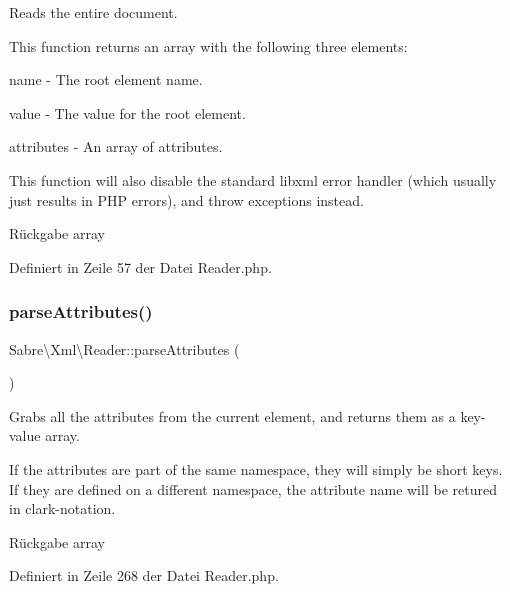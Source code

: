 Reads the entire document.

This function returns an array with the following three elements\+:
\begin{DoxyItemize}
\item name -\/ The root element name.
\item value -\/ The value for the root element.
\item attributes -\/ An array of attributes.
\end{DoxyItemize}

This function will also disable the standard libxml error handler (which usually just results in P\+HP errors), and throw exceptions instead.

\begin{DoxyReturn}{Rückgabe}
array 
\end{DoxyReturn}


Definiert in Zeile 57 der Datei Reader.\+php.

\mbox{\label{class_sabre_1_1_xml_1_1_reader_a174dc5b37a08e3842ccfa96ed7d7bfff}} 
\subsubsection{\texorpdfstring{parse\+Attributes()}{parseAttributes()}}
{\footnotesize\ttfamily Sabre\textbackslash{}\+Xml\textbackslash{}\+Reader\+::parse\+Attributes (\begin{DoxyParamCaption}{ }\end{DoxyParamCaption})}

Grabs all the attributes from the current element, and returns them as a key-\/value array.

If the attributes are part of the same namespace, they will simply be short keys. If they are defined on a different namespace, the attribute name will be retured in clark-\/notation.

\begin{DoxyReturn}{Rückgabe}
array 
\end{DoxyReturn}


Definiert in Zeile 268 der Datei Reader.\+php.

\mbox{\label{class_sabre_1_1_xml_1_1_reader_a0e72167035aa4fe05e7ed54b4f9f44bd}} 
